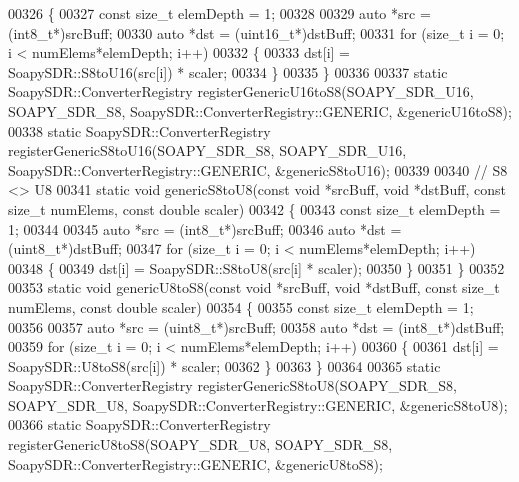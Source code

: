\begin{DoxyCode}
00326 \{
00327   \textcolor{keyword}{const} \textcolor{keywordtype}{size\_t} elemDepth = 1;
00328 
00329   \textcolor{keyword}{auto} *src = (int8\_t*)srcBuff;
00330   \textcolor{keyword}{auto} *dst = (uint16\_t*)dstBuff;
00331   \textcolor{keywordflow}{for} (\textcolor{keywordtype}{size\_t} i = 0; i < numElems*elemDepth; i++)
00332     \{
00333       dst[i] = SoapySDR::S8toU16(src[i]) * scaler;
00334     \}
00335 \}
00336 
00337 \textcolor{keyword}{static} SoapySDR::ConverterRegistry registerGenericU16toS8(SOAPY_SDR_U16, 
      SOAPY_SDR_S8, SoapySDR::ConverterRegistry::GENERIC, &genericU16toS8);
00338 \textcolor{keyword}{static} SoapySDR::ConverterRegistry registerGenericS8toU16(SOAPY_SDR_S8, 
      SOAPY_SDR_U16, SoapySDR::ConverterRegistry::GENERIC, &genericS8toU16);
00339 
00340 \textcolor{comment}{// S8 <> U8}
00341 \textcolor{keyword}{static} \textcolor{keywordtype}{void} genericS8toU8(\textcolor{keyword}{const} \textcolor{keywordtype}{void} *srcBuff, \textcolor{keywordtype}{void} *dstBuff, \textcolor{keyword}{const} \textcolor{keywordtype}{size\_t} numElems, \textcolor{keyword}{const} \textcolor{keywordtype}{double} scaler)
00342 \{
00343   \textcolor{keyword}{const} \textcolor{keywordtype}{size\_t} elemDepth = 1;
00344 
00345   \textcolor{keyword}{auto} *src = (int8\_t*)srcBuff;
00346   \textcolor{keyword}{auto} *dst = (uint8\_t*)dstBuff;
00347   \textcolor{keywordflow}{for} (\textcolor{keywordtype}{size\_t} i = 0; i < numElems*elemDepth; i++)
00348     \{
00349       dst[i] = SoapySDR::S8toU8(src[i] * scaler);
00350     \}
00351 \}
00352 
00353 \textcolor{keyword}{static} \textcolor{keywordtype}{void} genericU8toS8(\textcolor{keyword}{const} \textcolor{keywordtype}{void} *srcBuff, \textcolor{keywordtype}{void} *dstBuff, \textcolor{keyword}{const} \textcolor{keywordtype}{size\_t} numElems, \textcolor{keyword}{const} \textcolor{keywordtype}{double} scaler)
00354 \{
00355   \textcolor{keyword}{const} \textcolor{keywordtype}{size\_t} elemDepth = 1;
00356 
00357   \textcolor{keyword}{auto} *src = (uint8\_t*)srcBuff;
00358   \textcolor{keyword}{auto} *dst = (int8\_t*)dstBuff;
00359   \textcolor{keywordflow}{for} (\textcolor{keywordtype}{size\_t} i = 0; i < numElems*elemDepth; i++)
00360     \{
00361       dst[i] = SoapySDR::U8toS8(src[i]) * scaler;
00362     \}
00363 \}
00364 
00365 \textcolor{keyword}{static} SoapySDR::ConverterRegistry registerGenericS8toU8(SOAPY_SDR_S8, 
      SOAPY_SDR_U8, SoapySDR::ConverterRegistry::GENERIC, &genericS8toU8);
00366 \textcolor{keyword}{static} SoapySDR::ConverterRegistry registerGenericU8toS8(SOAPY_SDR_U8, 
      SOAPY_SDR_S8, SoapySDR::ConverterRegistry::GENERIC, &genericU8toS8);

\end{DoxyCode}
